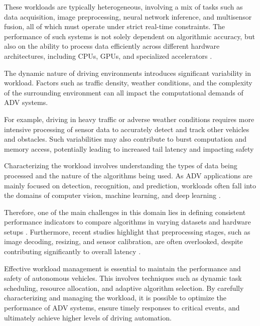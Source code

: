 These workloads are typically heterogeneous, involving a mix of tasks such as data acquisition, image preprocessing, neural network inference, and multisensor fusion, all of which must operate under strict real-time constraints. The performance of such systems is not solely dependent on algorithmic accuracy, but also on the ability to process data efficiently across different hardware architectures, including CPUs, GPUs, and specialized accelerators \cite{Tang2022CharacterizationEdge}.

The dynamic nature of driving environments introduces significant variability in workload. Factors such as traffic density, weather conditions, and the complexity of the surrounding environment can all impact the computational demands of ADV systems. 

For example, driving in heavy traffic or adverse weather conditions requires more intensive processing of sensor data to accurately detect and track other vehicles and obstacles. Such variabilities may also contribute to burst computation and memory access, potentially leading to increased tail latency and impacting safety \cite{Liu2023COLA:Systems}

Characterizing the workload involves understanding the types of data being processed and the nature of the algorithms being used. As ADV applications are mainly focused on detection, recognition, and prediction, workloads often fall into the domains of computer vision, machine learning, and deep learning \cite{wang2018}.

Therefore, one of the main challenges in this domain lies in defining consistent performance indicators to compare algorithms in varying datasets and hardware setups \cite{Kowalczyk2022EfficientVerification}. Furthermore, recent studies highlight that preprocessing stages, such as image decoding, resizing, and sensor calibration, are often overlooked, despite contributing significantly to overall latency \cite{Bachkaniwala2024Lotus:Profiling}.

Effective workload management is essential to maintain the performance and safety of autonomous vehicles. This involves techniques such as dynamic task scheduling, resource allocation, and adaptive algorithm selection. By carefully characterizing and managing the workload, it is possible to optimize the performance of ADV systems, ensure timely responses to critical events, and ultimately achieve higher levels of driving automation.


